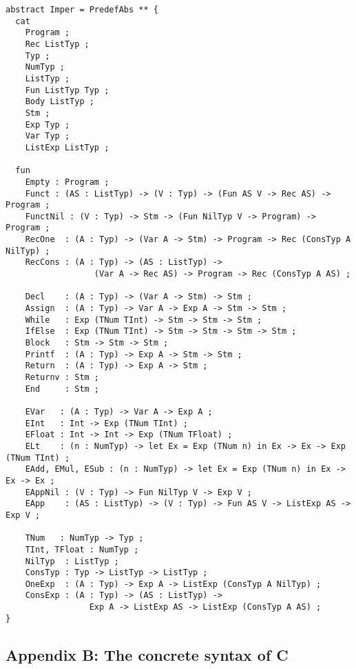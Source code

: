 \documentclass[12pt]{article}
\begin{document}
\small
\begin{verbatim}
abstract Imper = PredefAbs ** {
  cat
    Program ;
    Rec ListTyp ;
    Typ ;
    NumTyp ;
    ListTyp ;
    Fun ListTyp Typ ;
    Body ListTyp ;
    Stm ;
    Exp Typ ;
    Var Typ ;
    ListExp ListTyp ;

  fun
    Empty : Program ;
    Funct : (AS : ListTyp) -> (V : Typ) -> (Fun AS V -> Rec AS) -> Program ;
    FunctNil : (V : Typ) -> Stm -> (Fun NilTyp V -> Program) -> Program ;
    RecOne  : (A : Typ) -> (Var A -> Stm) -> Program -> Rec (ConsTyp A NilTyp) ;
    RecCons : (A : Typ) -> (AS : ListTyp) -> 
                  (Var A -> Rec AS) -> Program -> Rec (ConsTyp A AS) ;

    Decl    : (A : Typ) -> (Var A -> Stm) -> Stm ;
    Assign  : (A : Typ) -> Var A -> Exp A -> Stm -> Stm ;
    While   : Exp (TNum TInt) -> Stm -> Stm -> Stm ;
    IfElse  : Exp (TNum TInt) -> Stm -> Stm -> Stm -> Stm ;
    Block   : Stm -> Stm -> Stm ;
    Printf  : (A : Typ) -> Exp A -> Stm -> Stm ;
    Return  : (A : Typ) -> Exp A -> Stm ;
    Returnv : Stm ;
    End     : Stm ;

    EVar   : (A : Typ) -> Var A -> Exp A ;
    EInt   : Int -> Exp (TNum TInt) ;
    EFloat : Int -> Int -> Exp (TNum TFloat) ;
    ELt    : (n : NumTyp) -> let Ex = Exp (TNum n) in Ex -> Ex -> Exp (TNum TInt) ;
    EAdd, EMul, ESub : (n : NumTyp) -> let Ex = Exp (TNum n) in Ex -> Ex -> Ex ;
    EAppNil : (V : Typ) -> Fun NilTyp V -> Exp V ;
    EApp    : (AS : ListTyp) -> (V : Typ) -> Fun AS V -> ListExp AS -> Exp V ;

    TNum   : NumTyp -> Typ ;  
    TInt, TFloat : NumTyp ;
    NilTyp  : ListTyp ;
    ConsTyp : Typ -> ListTyp -> ListTyp ;
    OneExp  : (A : Typ) -> Exp A -> ListExp (ConsTyp A NilTyp) ;
    ConsExp : (A : Typ) -> (AS : ListTyp) -> 
                 Exp A -> ListExp AS -> ListExp (ConsTyp A AS) ;
}
\end{verbatim}
\normalsize
\newpage


\subsection*{Appendix B: The concrete syntax of C}
\end{document}
